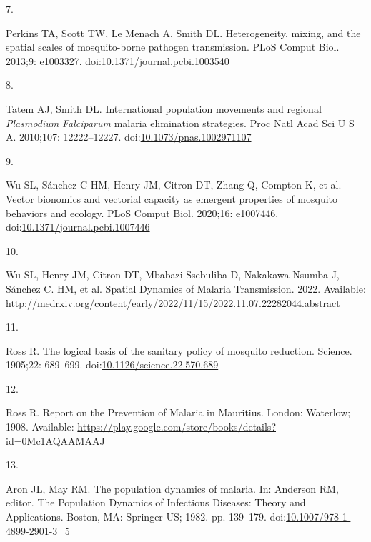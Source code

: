 \documentclass[
]{book}
\newlength{\cslhangindent}
\newlength{\csllabelwidth}
\newlength{\cslentryspacingunit} %
\newenvironment{CSLReferences}[2] %
 {%
  \setlength{\parindent}{0pt}
  \ifodd #1
  \let\oldpar\par
  \def\par{\hangindent=\cslhangindent\oldpar}
  \fi
  \setlength{\parskip}{#2\cslentryspacingunit}
 }%
 {}
\newcommand{\CSLLeftMargin}[1]{\parbox[t]{\csllabelwidth}{#1}}
\newcommand{\CSLRightInline}[1]{\parbox[t]{\linewidth - \csllabelwidth}{#1}\break}
\begin{document}
\begin{CSLReferences}{0}{0}
\leavevmode{}%
\CSLLeftMargin{7. }%
\CSLRightInline{Perkins TA, Scott TW, Le Menach A, Smith DL. Heterogeneity, mixing, and the spatial scales of mosquito-borne pathogen transmission. PLoS Comput Biol. 2013;9: e1003327. doi:\href{https://doi.org/10.1371/journal.pcbi.1003540}{10.1371/journal.pcbi.1003540}}

\leavevmode{}%
\CSLLeftMargin{8. }%
\CSLRightInline{Tatem AJ, Smith DL. International population movements and regional {\emph{Plasmodium}}{ \emph{Falciparum}} malaria elimination strategies. Proc Natl Acad Sci U S A. 2010;107: 12222--12227. doi:\href{https://doi.org/10.1073/pnas.1002971107}{10.1073/pnas.1002971107}}

\leavevmode{}%
\CSLLeftMargin{9. }%
\CSLRightInline{Wu SL, Sánchez C HM, Henry JM, Citron DT, Zhang Q, Compton K, et al. Vector bionomics and vectorial capacity as emergent properties of mosquito behaviors and ecology. PLoS Comput Biol. 2020;16: e1007446. doi:\href{https://doi.org/10.1371/journal.pcbi.1007446}{10.1371/journal.pcbi.1007446}}

\leavevmode{}%
\CSLLeftMargin{10. }%
\CSLRightInline{Wu SL, Henry JM, Citron DT, Mbabazi Ssebuliba D, Nakakawa Nsumba J, Sánchez C. HM, et al. Spatial {Dynamics} of {Malaria Transmission}. 2022. Available: \url{http://medrxiv.org/content/early/2022/11/15/2022.11.07.22282044.abstract}}

\leavevmode{}%
\CSLLeftMargin{11. }%
\CSLRightInline{Ross R. The logical basis of the sanitary policy of mosquito reduction. Science. 1905;22: 689--699. doi:\href{https://doi.org/10.1126/science.22.570.689}{10.1126/science.22.570.689}}

\leavevmode{}%
\CSLLeftMargin{12. }%
\CSLRightInline{Ross R. Report on the {Prevention} of {Malaria} in {Mauritius}. {London}: {Waterlow}; 1908. Available: \url{https://play.google.com/store/books/details?id=0Mc1AQAAMAAJ}}

\leavevmode{}%
\CSLLeftMargin{13. }%
\CSLRightInline{Aron JL, May RM. The population dynamics of malaria. In: Anderson RM, editor. The {Population Dynamics} of {Infectious Diseases}: {Theory} and {Applications}. {Boston, MA}: {Springer US}; 1982. pp. 139--179. doi:\href{https://doi.org/10.1007/978-1-4899-2901-3_5}{10.1007/978-1-4899-2901-3\_5}}


\end{CSLReferences}
\end{document}
